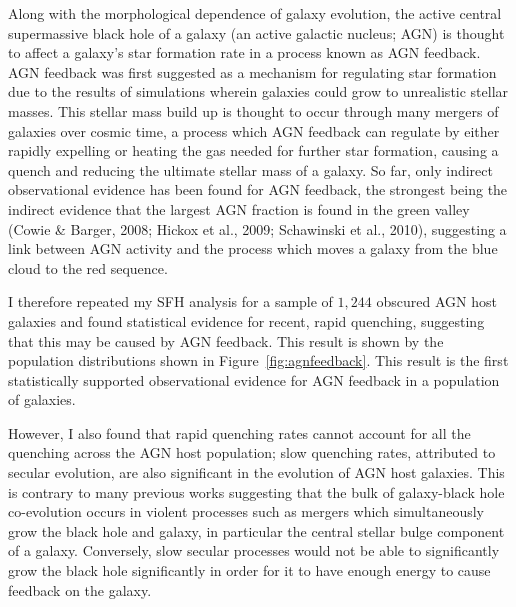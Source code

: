 \documentclass[12pt]{article}
\begin{document}
Along with the morphological dependence of galaxy evolution, the active central supermassive black hole of a galaxy (an active galactic nucleus; AGN) is thought to affect a galaxy's star formation rate in a process known as AGN feedback. AGN feedback was first suggested as a mechanism for regulating star formation due to the results of simulations wherein galaxies could grow to unrealistic stellar masses. This stellar mass build up is thought to occur through many mergers of galaxies over cosmic time, a process which AGN feedback can regulate by either rapidly expelling or heating the gas needed for further star formation, causing a quench and reducing the ultimate stellar mass of a galaxy. So far, only indirect observational evidence has been found for AGN feedback, the strongest being the indirect evidence that the largest AGN fraction is found in the green valley (Cowie \& Barger, 2008; Hickox et al., 2009; Schawinski et al., 2010), suggesting a link between AGN activity and the process which moves a galaxy from the blue cloud to the red sequence.

I therefore repeated my SFH analysis for a sample of $1,244$ obscured AGN host galaxies and found statistical evidence for recent, rapid quenching, suggesting that this may be caused by AGN feedback. This result is shown by the population distributions shown in Figure~\ref{fig:agnfeedback}. This result is the first statistically supported observational evidence for AGN feedback in a population of galaxies. 

However, I also found that rapid quenching rates cannot account for all the quenching across the AGN host population; slow quenching rates, attributed to secular evolution, are also significant in the evolution of AGN host galaxies. This is contrary to many previous works suggesting that the bulk of galaxy-black hole co-evolution occurs in violent processes such as mergers which simultaneously grow the black hole and galaxy, in particular the central stellar bulge component of a galaxy. Conversely, slow secular processes would not be able to significantly grow the black hole significantly in order for it to have enough energy to cause feedback on the galaxy.
\end{document}
